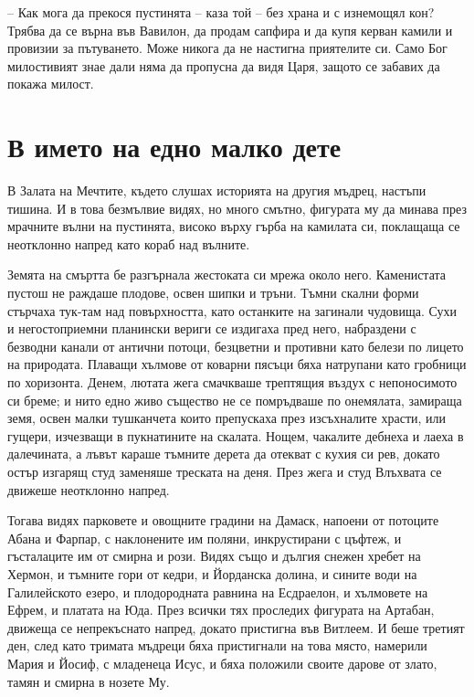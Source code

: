 -- Как мога да прекося пустинята -- каза той -- без храна и с изнемощял кон?
Трябва да се върна във Вавилон, да продам сапфира и да купя керван камили и
провизии за пътуването. Може никога да не настигна приятелите си. Само Бог
милостивият знае дали няма да пропусна да видя Царя, защото се забавих да покажа
милост.

\part{В името на едно малко дете}

В Залата на Мечтите, където слушах историята на другия мъдрец, настъпи тишина. И
в това безмълвие видях, но много смътно, фигурата му да минава през мрачните
вълни на пустинята, високо върху гърба на камилата си, поклащаща се неотклонно
напред като кораб над вълните.

Земята на смъртта бе разгърнала жестоката си мрежа около него. Каменистата
пустош не раждаше плодове, освен шипки и тръни. Тъмни скални форми стърчаха
тук-там над повърхността, като останките на загинали чудовища. Сухи и
негостоприемни планински вериги се издигаха пред него, набраздени с безводни
канали от антични потоци, безцветни и противни като белези по лицето на
природата. Плаващи хълмове от коварни пясъци бяха натрупани като гробници по
хоризонта. Денем, лютата жега смачкваше трептящия въздух с непоносимото си
бреме; и нито едно живо същество не се помръдваше по онемялата, замираща земя,
освен малки тушканчета които препускаха през изсъхналите храсти, или гущери,
изчезващи в пукнатините на скалата. Нощем, чакалите дебнеха и лаеха в
далечината, а лъвът караше тъмните дерета да отекват с кухия си рев, докато
остър изгарящ студ заменяше треската на деня. През жега и студ Влъхвата се
движеше неотклонно напред.

Тогава видях парковете и овощните градини на Дамаск, напоени от потоците Абана и
Фарпар, с наклонените им поляни, инкрустирани с цъфтеж, и гъсталаците им от
смирна и рози. Видях също и дългия снежен хребет на Хермон, и тъмните гори от
кедри, и Йорданска долина, и сините води на Галилейското езеро, и плодородната
равнина на Есдраелон, и хълмовете на Ефрем, и платата на Юда. През всички тях
проследих фигурата на Артабан, движеща се непрекъснато напред, докато пристигна
във Витлеем. И беше третият ден, след като тримата мъдреци бяха пристигнали на
това място, намерили Мария и Йосиф, с младенеца Исус, и бяха положили своите
дарове от злато, тамян и смирна в нозете Му.

